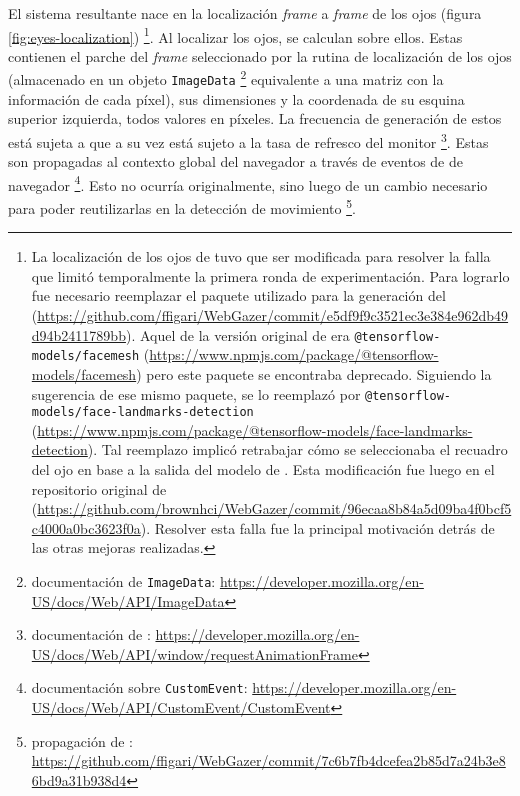   El sistema resultante nace en la localización \textit{frame} a \textit{frame}
  de los ojos (figura \ref{fig:eyes-localization})
  \footnote{
    La localización de los ojos de \webgazer tuvo que ser modificada para
    resolver la falla que limitó temporalmente la primera ronda de
    experimentación.
    Para lograrlo fue necesario reemplazar el paquete utilizado para la
    generación del \facemesh
    (\url{https://github.com/ffigari/WebGazer/commit/e5df9f9c3521ec3e384e962db49d94b2411789bb}).
    Aquel de la versión original de \webgazer era
    \texttt{@tensorflow-models/facemesh}
    (\url{https://www.npmjs.com/package/@tensorflow-models/facemesh}) pero este
    paquete se encontraba deprecado.
    Siguiendo la sugerencia de ese mismo paquete, se lo reemplazó por
    \texttt{@tensorflow-models/face-landmarks-detection}
    (\url{https://www.npmjs.com/package/@tensorflow-models/face-landmarks-detection}).
    Tal reemplazo implicó retrabajar cómo se seleccionaba el recuadro del ojo
    en base a la salida del modelo de \facemesh.
    Esta modificación fue luego \mergeada en el repositorio original de
    \webgazer
    (\url{https://github.com/brownhci/WebGazer/commit/96ecaa8b84a5d09ba4f0bcf5c4000a0bc3623f0a}).
    Resolver esta falla fue la principal motivación detrás de las otras mejoras
    realizadas.
  }.
  Al localizar los ojos, se calculan \features sobre ellos.
  Estas contienen el parche del \textit{frame} seleccionado por la rutina de
  localización de los ojos (almacenado en un objeto \texttt{ImageData}
  \footnote{
    documentación de \texttt{ImageData}:
    \url{https://developer.mozilla.org/en-US/docs/Web/API/ImageData}
  } equivalente a una matriz con la información de cada píxel), sus dimensiones
  y la coordenada de su esquina superior izquierda, todos valores en píxeles.
  La frecuencia de generación de estos \features está sujeta a \raf que a su
  vez está sujeto a la tasa de refresco del monitor \footnote{
    documentación de \raf:
    \url{https://developer.mozilla.org/en-US/docs/Web/API/window/requestAnimationFrame}
  }.
  Estas \features son propagadas al contexto global del navegador a través de
  eventos de \js de navegador \footnote{
    documentación sobre \texttt{CustomEvent}:
    \url{https://developer.mozilla.org/en-US/docs/Web/API/CustomEvent/CustomEvent}
  }.
  Esto no ocurría originalmente, sino luego de un cambio necesario para poder
  reutilizarlas en la detección de movimiento \footnote{
    propagación de \features:
    \url{https://github.com/ffigari/WebGazer/commit/7c6b7fb4dcefea2b85d7a24b3e86bd9a31b938d4}
  }.

